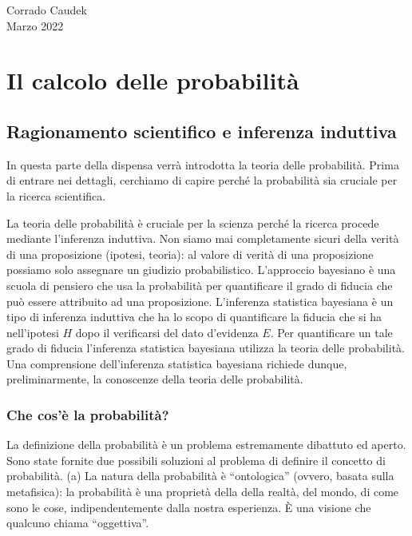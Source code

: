 \documentclass[
  11pt,
]{krantz}
\theoremstyle{definition}
\theoremstyle{definition}
\theoremstyle{definition}
\theoremstyle{definition}
\theoremstyle{remark}
\begin{document}
\begin{flushright}
Corrado Caudek\\
Marzo 2022 \end{flushright}

\mainmatter

\hypertarget{part-il-calcolo-delle-probabilituxe0}{%
\part{Il calcolo delle probabilità}\label{part-il-calcolo-delle-probabilituxe0}}

\hypertarget{intro-prob-1}{%
\chapter{Ragionamento scientifico e inferenza induttiva}\label{intro-prob-1}}

In questa parte della dispensa verrà introdotta la teoria delle probabilità. Prima di entrare nei dettagli, cerchiamo di capire perché la probabilità sia cruciale per la ricerca scientifica.

La teoria delle probabilità è cruciale per la scienza perché la ricerca procede mediante l'inferenza induttiva. Non siamo mai completamente sicuri della verità di una proposizione (ipotesi, teoria): al valore di verità di una proposizione possiamo solo assegnare un giudizio probabilistico. L'approccio bayesiano è una scuola di pensiero che usa la probabilità per quantificare il grado di fiducia che può essere attribuito ad una proposizione. L'inferenza statistica bayesiana è un tipo di inferenza induttiva che ha lo scopo di quantificare la fiducia che si ha nell'ipotesi \(H\) dopo il verificarsi del dato d'evidenza \(E\). Per quantificare un tale grado di fiducia l'inferenza statistica bayesiana utilizza la teoria delle probabilità. Una comprensione dell'inferenza statistica bayesiana richiede dunque, preliminarmente, la conoscenze della teoria delle probabilità.

\hypertarget{che-cosuxe8-la-probabilituxe0}{%
\section{Che cos'è la probabilità?}\label{che-cosuxe8-la-probabilituxe0}}

La definizione della probabilità è un problema estremamente dibattuto ed aperto. Sono state fornite due possibili soluzioni al problema di definire il concetto di probabilità. (a) La natura della probabilità è ``ontologica'' (ovvero, basata sulla metafisica): la probabilità è una proprietà della della realtà, del mondo, di come sono le cose, indipendentemente dalla nostra esperienza. È una visione che qualcuno chiama ``oggettiva''.
\end{document}
